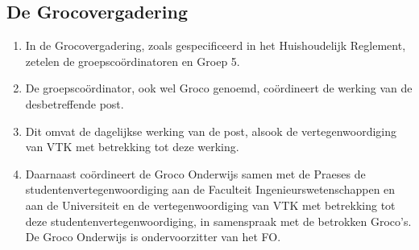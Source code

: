 \subsection{De Grocovergadering}\label{sec:Groco}

    

    \begin{enumerate}
        \item In de Grocovergadering, zoals gespecificeerd in het Huishoudelijk Reglement, zetelen de groepsco\"ordinatoren en Groep 5.
        \item De groepsco\"ordinator, ook wel Groco genoemd, co\"ordineert de werking van de desbetreffende post.
        \item Dit omvat de dagelijkse werking van de post, alsook de vertegenwoordiging van VTK met betrekking tot deze werking.
        \item Daarnaast co\"ordineert de Groco Onderwijs samen met de Praeses de studentenvertegenwoordiging aan de Faculteit Ingenieurswetenschappen en aan de Universiteit en de vertegenwoordiging van VTK met betrekking tot deze studentenvertegenwoordiging, in samenspraak met de betrokken Groco’s. De Groco Onderwijs is ondervoorzitter van het FO.
    \end{enumerate}

